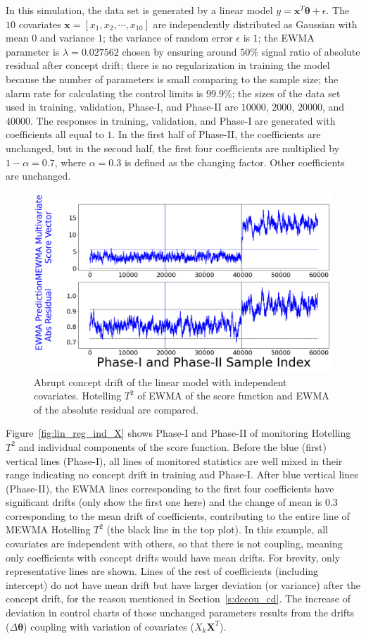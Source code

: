 \documentclass[twoside,11pt]{article}
\begin{document}
\begin{appendix}
In this simulation, the data set is generated by a {linear} model $y = \bm {x}^T\bm { \theta} + \epsilon$. The $10$ {covariates} {$\bm {x}=[x_1, x_2, \cdots, x _{10}]$} are independently distributed as Gaussian with mean $0$ and variance $1$; the variance of random error $ \epsilon$ is $1$; the EWMA parameter is $\lambda=0.027562$ chosen by ensuring around $50\%$ signal ratio of absolute residual after concept drift; there is no regularization in training the model because the number of parameters is small comparing to the sample size; the alarm rate for calculating the control limits is $99.9\%$; the sizes of the data set used in training, validation, Phase-I, and Phase-II are $10000$, $2000$, $20000$, and $40000$. The responses in training, validation, and Phase-I are generated with coefficients all equal to $1$. In the first half of Phase-II, the coefficients are unchanged, but in the second half, the first four coefficients are multiplied by $1- \alpha=0.7$, where $ \alpha=0.3$ is defined as the changing factor. Other coefficients are unchanged.
\begin{figure}[!htp]
\centering
\includegraphics[width = 0.6\linewidth]{../figures/v14/sim_2/reg/1_sim2_lin_1e-08_0_005_1.png}
  \caption{Abrupt concept drift of the linear model with independent covariates. Hotelling $T^2$ of EWMA of the score function and EWMA of the absolute residual are compared.}
  \label{fig:lin_reg_ind_X_comp}
\end{figure}

Figure~\ref{fig:lin_reg_ind_X} shows Phase-I and Phase-II of monitoring Hotelling $T^2$ and individual components of the score function. Before the blue (first) vertical lines (Phase-I), all lines of monitored statistics are well mixed in their range indicating no concept drift in training and Phase-I. After blue vertical lines (Phase-II), the EWMA lines corresponding to the first four coefficients have significant drifts (only show the first one here) and the change of mean is $0.3$ corresponding to the mean drift of coefficients, contributing to the entire line of MEWMA Hotelling $T^2$ (the black line in the top plot). In this example, all covariates are independent with others, so that there is not coupling, meaning only coefficients with concept drifts would have mean drifts. For brevity, only representative lines are shown. Lines of the rest of coefficients (including intercept) do not have mean drift but have larger deviation (or variance) after the concept drift, for the reason mentioned in Section~\ref{s:decou_cd}. The increase of deviation in control charts of those unchanged parameters results from the drifts ($\Delta \bm { \theta}$) coupling with variation of covariates ($X_k\bm {X}^T$).


\end{appendix}
\end{document}
